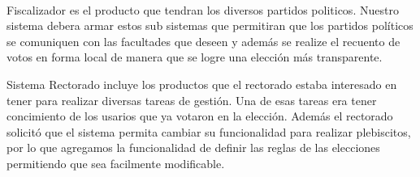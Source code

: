 \\ \par
Fiscalizador es el producto que tendran los diversos partidos politicos. Nuestro sistema debera armar estos sub sistemas que permitiran que los partidos pol\'iticos se comuniquen con las facultades que deseen y además se realize el recuento de votos en forma local de manera que se logre una elección más transparente. 
\\ \par
Sistema Rectorado incluye los productos que el rectorado estaba interesado en tener para realizar diversas tareas de gestión. Una de esas tareas era tener concimiento de los usarios que ya votaron en la elección. Además el rectorado solicitó que el sistema permita cambiar su funcionalidad para realizar plebiscitos, por lo que agregamos la funcionalidad de definir las reglas de las elecciones permitiendo que sea facilmente modificable.

